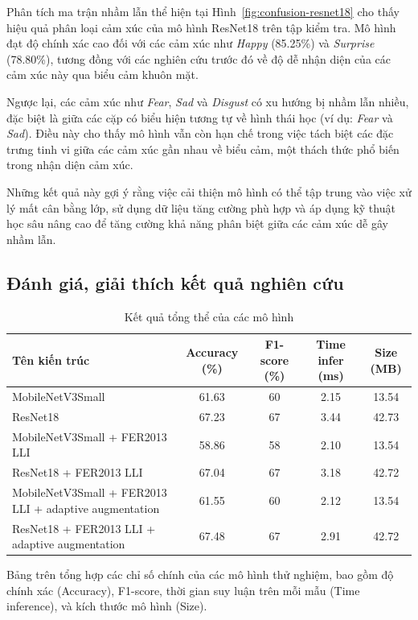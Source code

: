 Phân tích ma trận nhầm lẫn thể hiện tại Hình~\ref{fig:confusion-resnet18} cho thấy hiệu quả phân loại cảm xúc của mô hình ResNet18 trên tập kiểm tra. Mô hình đạt độ chính xác cao đối với các cảm xúc như \textit{Happy} (85.25\%) và \textit{Surprise} (78.80\%), tương đồng với các nghiên cứu trước đó về độ dễ nhận diện của các cảm xúc này qua biểu cảm khuôn mặt.

Ngược lại, các cảm xúc như \textit{Fear}, \textit{Sad} và \textit{Disgust} có xu hướng bị nhầm lẫn nhiều, đặc biệt là giữa các cặp có biểu hiện tương tự về hình thái học (ví dụ: \textit{Fear} và \textit{Sad}). Điều này cho thấy mô hình vẫn còn hạn chế trong việc tách biệt các đặc trưng tinh vi giữa các cảm xúc gần nhau về biểu cảm, một thách thức phổ biến trong nhận diện cảm xúc.

Những kết quả này gợi ý rằng việc cải thiện mô hình có thể tập trung vào việc xử lý mất cân bằng lớp, sử dụng dữ liệu tăng cường phù hợp và áp dụng kỹ thuật học sâu nâng cao để tăng cường khả năng phân biệt giữa các cảm xúc dễ gây nhầm lẫn.


\subsection{Đánh giá, giải thích kết quả nghiên cứu}

\begin{table}[H]
\centering
\caption{Kết quả tổng thể của các mô hình}
\begin{tabular}{@{}>{\raggedright\arraybackslash}p{5cm}cccc@{}}
\toprule
\textbf{Tên kiến trúc} & \textbf{Accuracy (\%)} & \textbf{F1-score (\%)} & \textbf{Time infer (ms)} & \textbf{Size (MB)} \\ \midrule
MobileNetV3Small & 61.63 & 60 & 2.15 & 13.54 \\
ResNet18 & 67.23 & 67 & 3.44 & 42.73 \\
MobileNetV3Small + FER2013 LLI & 58.86 & 58 & 2.10 & 13.54 \\
ResNet18 + FER2013 LLI & 67.04 & 67 & 3.18 & 42.72 \\
MobileNetV3Small + FER2013 LLI + adaptive augmentation & 61.55 & 60 & 2.12 & 13.54 \\
ResNet18 + FER2013 LLI + adaptive augmentation & 67.48 & 67 & 2.91 & 42.72 \\ \bottomrule
\end{tabular}
\label{tab:overall-results}
\end{table}

Bảng trên tổng hợp các chỉ số chính của các mô hình thử nghiệm, bao gồm độ chính xác (Accuracy), F1-score, thời gian suy luận trên mỗi mẫu (Time inference), và kích thước mô hình (Size). 

